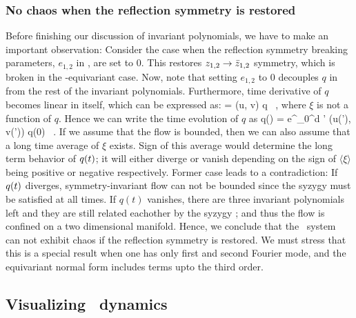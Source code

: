\subsubsection{No chaos when the reflection symmetry is restored}
\label{s:dfsafs}

Before finishing our discussion of invariant polynomials, we have to make an
important observation: Consider the case when the reflection symmetry breaking
parameters, $e_{1,2}$ in , are set to $0$. This restores
$z_{1,2} \rightarrow \bar{z}_{1,2}$ symmetry, which is broken in
the -equivariant case. Now, note that setting $ e_{1,2} $ to $0$
decouples $q$ in  from the rest of the invariant polynomials.
Furthermore, time derivative of $q$ becomes linear in itself, which can be
expressed as:
\beq
     = \xi (u, v) q \, ,
where $\xi$ is not a function of $q$. Hence we can write
the time evolution of $q$ as
\beq
    q(\zeit) =  e^{\int_0^\zeit d \zeit' \xi (u(\zeit'), v(\zeit'))} q(0) \, .
If we assume that the flow is bounded, then we can also assume that a long time
average of $\xi$ exists. Sign of this average would determine the long term
behavior of $q(t)$; it will either diverge or vanish depending on the sign of
$\langle \xi \rangle$ being positive or negative respectively. Former case
leads to a contradiction: If $q(t)$ diverges, symmetry-invariant flow can not
be bounded since the syzygy  must be satisfied at all times. If
$q(t)$ vanishes, there are three invariant polynomials left and they are still
related eachother by the syzygy ; and thus the flow is confined
on a two dimensional manifold. Hence, we conclude that the \twomode\ system
 can not exhibit chaos if the reflection symmetry is restored.
We must stress that this is a special result when one has only first and second
Fourier mode, and the equivariant normal form includes terms upto the third order.

\subsection{Visualizing \twomode\ dynamics}
\label{s:visual}

